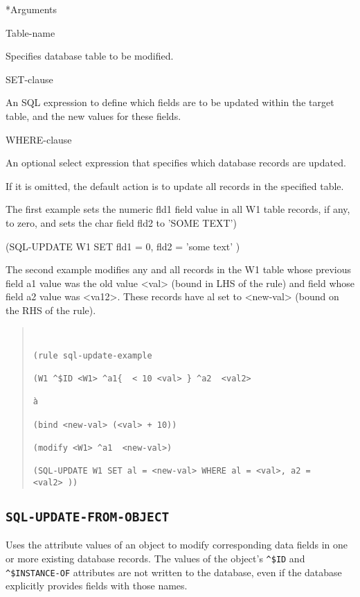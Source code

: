 {{*Arguments

Table-name

Specifies database table to be modified.

SET-clause

An SQL expression to define which fields are to be updated
within the target table, and the new values for these fields.

WHERE-clause

An optional select expression that specifies which database
records are updated.

If it is omitted, the default action is to update all records
in the specified table.



\Example

The first example sets the numeric fld1 field value in all W1
table records, if any, to zero, and sets the char field fld2
to 'SOME TEXT')



(SQL-UPDATE W1 SET fld1 = 0, fld2 = 'some text' )



The second example modifies any and all records in the W1
table whose previous field a1 value was the old value <val>
(bound in LHS of the rule) and field whose field a2 value was
<va12>. These records have al set to <new-val> (bound on the
RHS of the rule).
\begin{quote}
\begin{verbatim}


(rule sql-update-example

(W1 ^$ID <W1> ^a1{  < 10 <val> } ^a2  <val2>

à

(bind <new-val> (<val> + 10))

(modify <W1> ^a1  <new-val>)

(SQL-UPDATE W1 SET al = <new-val> WHERE al = <val>, a2 =
<val2> ))
\end{verbatim}
\end{quote}

\subsection{\tt{SQL-UPDATE-FROM-OBJECT}}

Uses the attribute values of an object to modify
corresponding data fields in one or more existing database
records. The values of the object's \verb|^$ID| and \verb|^$INSTANCE-OF|
attributes are not written to the database, even if the
database explicitly provides fields with those names.

}}

